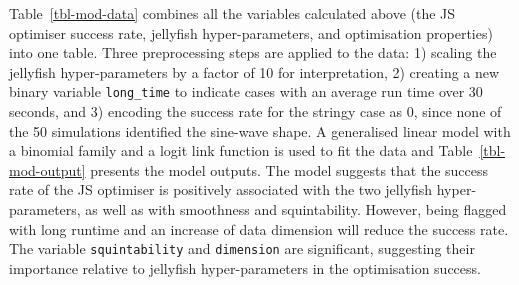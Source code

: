 \documentclass[
  number,
  preprint,
  3p]{elsarticle}
\begin{document}
Table~\ref{tbl-mod-data} combines all the variables calculated above
(the JS optimiser success rate, jellyfish hyper-parameters, and
optimisation properties) into one table. Three preprocessing steps are
applied to the data: 1) scaling the jellyfish hyper-parameters by a
factor of 10 for interpretation, 2) creating a new binary variable
\texttt{long\_time} to indicate cases with an average run time over 30
seconds, and 3) encoding the success rate for the stringy case as 0,
since none of the 50 simulations identified the sine-wave shape. A
generalised linear model with a binomial family and a logit link
function is used to fit the data and Table~\ref{tbl-mod-output} presents
the model outputs. The model suggests that the success rate of the JS
optimiser is positively associated with the two jellyfish
hyper-parameters, as well as with smoothness and squintability. However,
being flagged with long runtime and an increase of data dimension will
reduce the success rate. The variable \texttt{squintability} and
\texttt{dimension} are significant, suggesting their importance relative
to jellyfish hyper-parameters in the optimisation success.
\end{document}
